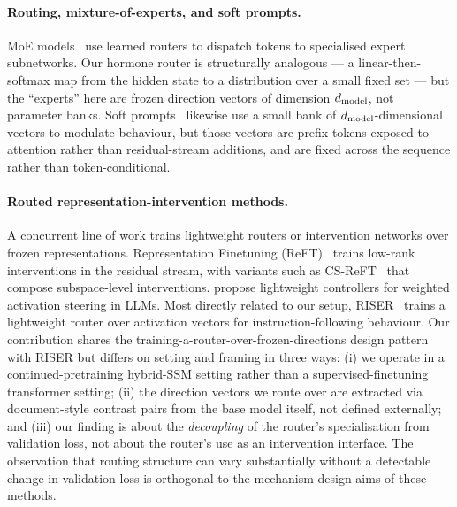 \paragraph{Routing, mixture-of-experts, and soft prompts.}
MoE models~\citep{shazeer2017outrageously,fedus2022switch,jiang2024mixtral} use learned routers to dispatch tokens to specialised expert subnetworks. Our hormone router is structurally analogous --- a linear-then-softmax map from the hidden state to a distribution over a small fixed set --- but the ``experts'' here are frozen direction vectors of dimension $d_{\text{model}}$, not parameter banks. Soft prompts~\citep{lester2021power,li2021prefix} likewise use a small bank of $d_{\text{model}}$-dimensional vectors to modulate behaviour, but those vectors are prefix tokens exposed to attention rather than residual-stream additions, and are fixed across the sequence rather than token-conditional.

\paragraph{Routed representation-intervention methods.}
A concurrent line of work trains lightweight routers or intervention networks over frozen representations. Representation Finetuning (ReFT)~\citep{wu2024reft} trains low-rank interventions in the residual stream, with variants such as CS-ReFT~\citep{wu2024csreft} that compose subspace-level interventions. \citet{zhang2024guidinggiants} propose lightweight controllers for weighted activation steering in LLMs. Most directly related to our setup, RISER~\citep{postmus2024riser} trains a lightweight router over activation vectors for instruction-following behaviour. Our contribution shares the training-a-router-over-frozen-directions design pattern with RISER but differs on setting and framing in three ways: (i) we operate in a continued-pretraining hybrid-SSM setting rather than a supervised-finetuning transformer setting; (ii) the direction vectors we route over are extracted via document-style contrast pairs from the base model itself, not defined externally; and (iii) our finding is about the \emph{decoupling} of the router's specialisation from validation loss, not about the router's use as an intervention interface. The observation that routing structure can vary substantially without a detectable change in validation loss is orthogonal to the mechanism-design aims of these methods.

